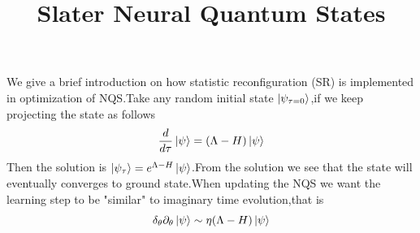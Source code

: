 \documentclass[a4paper,12pt]{article}
\title{Slater Neural Quantum States}
\theoremstyle{mystyle}
\theoremstyle{mystyle}
\numberwithin{equation}{section}
\begin{document}
	\maketitle
	We give a brief introduction on how statistic reconfiguration (SR) is implemented in optimization of NQS.Take any random initial state $\ket{\psi_{\tau=0}}$,if we keep projecting the state as follows
	$$\frac{d}{d\tau}\ket{\psi}=(\Lambda-H)\ket{\psi}$$
	Then the solution is $\ket{\psi_\tau}=e^{\Lambda-H}\ket{\psi}$.From the solution we see that the state will eventually converges to ground state.When updating the NQS we want the learning step to be "similar" to imaginary time evolution,that is
	$$\delta_\theta \partial_\theta \ket{\psi}\sim \eta(\Lambda-H)\ket{\psi}$$
\end{document}
